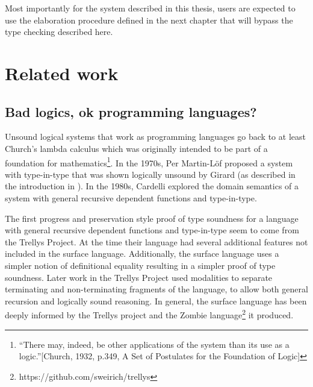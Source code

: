 Most importantly for the system described in this thesis, users are expected to use the elaboration procedure defined in the next chapter that will bypass the type checking described here.

\section{Related work}

\subsection{Bad logics, ok programming languages?}

Unsound logical systems that work as programming languages go back to at least Church's lambda calculus which was originally intended to be part of a foundation for mathematics\footnote{``There may, indeed, be other applications of the system than its use as a logic.''{[}Church, 1932, p.349, A Set of Postulates for the Foundation of Logic{]}}.
In the 1970s, Per Martin-L{\"o}f proposed a system with type-in-type that was shown logically unsound by Girard (as described in the introduction in \cite{Martin-Lof-1972}).
In the 1980s, Cardelli explored the domain semantics of a system with general recursive dependent functions and type-in-type\cite{cardelli1986polymorphic}.

The first progress and preservation style proof of type soundness for a language with general recursive dependent functions and type-in-type seem to come from the Trellys Project\cite{sjoberg2012irrelevance}.
At the time their language had several additional features not included in the surface language.
Additionally, the surface language uses a simpler notion of definitional equality resulting in a simpler proof of type soundness.
Later work in the Trellys Project\cite{casinghino2014combining,casinghino2014combiningthesis} used modalities to separate terminating and non-terminating fragments of the language, to allow both general recursion and logically sound reasoning.%
In general, the surface language has been deeply informed by the Trellys project\cite{sjoberg2012irrelevance,casinghino2014combining,casinghino2014combiningthesis,sjoberg2015programming,sjoberg2015dependently} and the Zombie language\footnote{https://github.com/sweirich/trellys} it produced.

